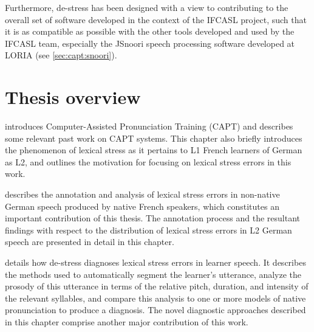 Furthermore, 
de-stress
 has been designed with a view to contributing to the overall set of software developed in the context of the IFCASL project, such that it is as compatible as possible with the other tools developed and used by the IFCASL team, especially the JSnoori speech processing software developed at LORIA (see \cref{sec:capt:snoori}).




\section{Thesis overview}
\label{sec:intro:overview}


 introduces Computer-Assisted Pronunciation Training (CAPT) 
and describes some relevant past work on CAPT systems. 
This chapter also briefly 
introduces the phenomenon of lexical stress as it pertains to L1 French learners of German as L2, and outlines
the motivation for focusing on lexical stress errors in this work.


describes 
the annotation and analysis of lexical stress errors in 
non-native German speech produced by native French speakers, which constitutes an important contribution of this thesis. 
The annotation process and the resultant findings with respect to the distribution of lexical stress errors in L2 German speech are presented in detail in this chapter.

 details how de-stress diagnoses lexical stress errors in learner speech. It describes the methods used to automatically segment the learner's utterance, analyze the prosody of this utterance in terms of the relative pitch, duration, and intensity of the relevant syllables, and compare this analysis to one or more models of native pronunciation to produce a diagnosis. The novel diagnostic approaches described in this chapter comprise another major contribution of this work. 

